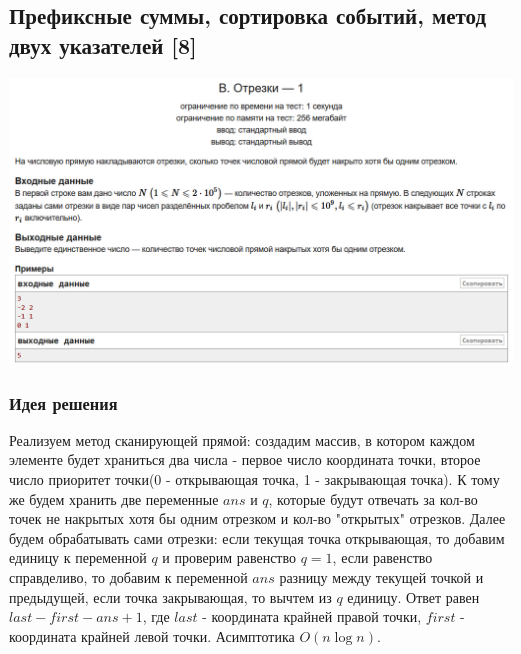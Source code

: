 \subsection*{ Префиксные суммы, сортировка событий, метод двух указателей [8]}
\begin{center}
\includegraphics[width=\textwidth]{10B.png}
\end{center}
\subsubsection*{Идея решения}
Реализуем метод сканирующей прямой: создадим массив, в котором каждом элементе будет храниться два числа - первое число координата точки, второе число приоритет точки(0 - открывающая точка, 1 - закрывающая точка). К тому же будем хранить две переменные $ans$ и $q$, которые будут отвечать за кол-во точек не накрытых хотя бы одним отрезком и кол-во "открытых" отрезков. Далее будем обрабатывать сами отрезки: если текущая точка  открывающая, то добавим единицу к переменной $q$ и проверим равенство $q = 1$, если равенство справделиво, то добавим к переменной $ans$ разницу между текущей точкой и предыдущей, если точка закрывающая, то вычтем из $q$ единицу. Ответ равен $last - first - ans +1$, где $last$ - координата крайней правой точки, $first$ - координата крайней левой точки. Асимптотика $O(n\log{}n)$.
